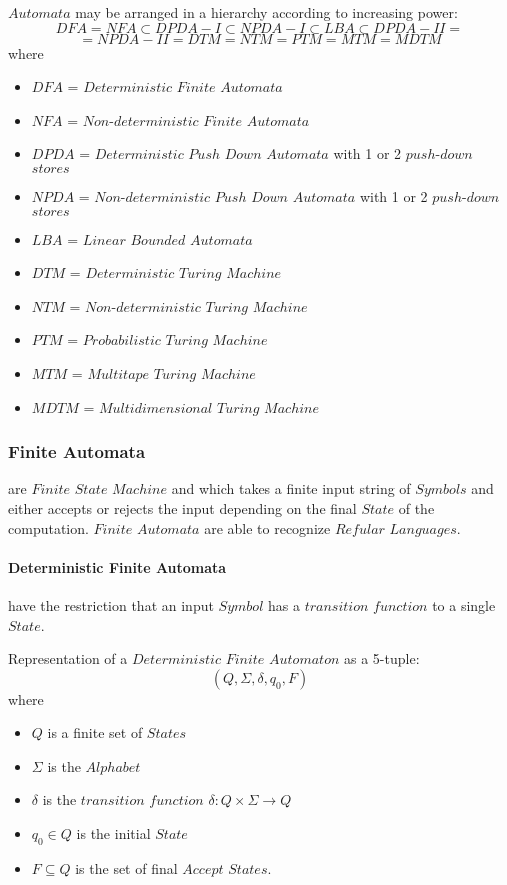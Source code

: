 \documentclass{article}
\begin{document}
    $Automata$ may be arranged in a hierarchy according to increasing power:
    \[
        DFA = NFA \subset DPDA-I \subset NPDA-I \subset LBA \subset DPDA-II =
    \]\[
        = NPDA-II = DTM = NTM = PTM = MTM = MDTM
    \]
    where
    \begin{itemize}
    \item $DFA$ = $Deterministic$ $Finite$ $Automata$
    \item $NFA$ = $Non$-$deterministic$ $Finite$ $Automata$
    \item $DPDA$ = $Deterministic$ $Push$ $Down$ $Automata$ with 1
      or 2 $push$-$down$ $stores$
    \item $NPDA$ = $Non$-$deterministic$ $Push$ $Down$ $Automata$
      with 1 or 2 $push$-$down$ $stores$
    \item $LBA$ = $Linear$ $Bounded$ $Automata$
    \item $DTM$ = $Deterministic$ $Turing$ $Machine$
    \item $NTM$ = $Non$-$deterministic$ $Turing$ $Machine$
    \item $PTM$ = $Probabilistic$ $Turing$ $Machine$
    \item $MTM$ = $Multitape$ $Turing$ $Machine$
    \item $MDTM$ = $Multidimensional$ $Turing$ $Machine$
    \end{itemize}

    \subsubsection{Finite Automata} are $Finite$ $State$
    $Machine$ and which takes a finite input string of $Symbols$ and
    either accepts or rejects the input depending on the final $State$
    of the computation. $Finite$ $Automata$ are able to recognize
    $Refular$ $Languages$.

    \paragraph{Deterministic Finite Automata} have the restriction
    that an input $Symbol$ has a $transition$ $function$ to a single
    $State$.

    Representation of a $Deterministic$ $Finite$ $Automaton$ as a 5-tuple:
    \[
        (Q,\Sigma,\delta,q_0,F)
    \]
    where
    \begin{itemize}
    \item $Q$ is a finite set of $States$
    \item $\Sigma$ is the $Alphabet$
    \item $\delta$ is the $transition$ $function$ $\delta: Q \times
      \Sigma \rightarrow Q$
    \item $q_0 \in Q$ is the initial $State$
    \item $F \subseteq Q$ is the set of final $Accept$ $States$.
    \end{itemize}
\end{document}
